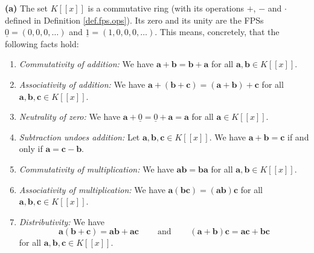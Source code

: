 \begin{theorem}
\label{thm.fps.ring}
\leantarget
\leanok
\textbf{(a)} The set $K\left[\left[x\right]\right]$
is a commutative ring (with its operations $+$, $-$ and $\cdot$ defined in
Definition \ref{def.fps.ops}). Its zero and its unity are the FPSs
$\underline{0}=\left(0,0,0,\ldots\right)$ and $\underline{1}=\left(
1,0,0,0,\ldots\right)$. This means, concretely, that the following facts hold:

\begin{enumerate}
\item \emph{Commutativity of addition:} We have $\mathbf{a}+\mathbf{b}%
=\mathbf{b}+\mathbf{a}$ for all $\mathbf{a},\mathbf{b}\in K\left[\left[
x\right]\right]$.

\item \emph{Associativity of addition:} We have $\mathbf{a}+\left(
\mathbf{b}+\mathbf{c}\right) =\left(\mathbf{a}+\mathbf{b}\right)
+\mathbf{c}$ for all $\mathbf{a},\mathbf{b},\mathbf{c}\in K\left[\left[
x\right]\right]$.

\item \emph{Neutrality of zero:} We have $\mathbf{a}+\underline{0}%
=\underline{0}+\mathbf{a}=\mathbf{a}$ for all $\mathbf{a}\in K\left[\left[
x\right]\right]$.

\item \emph{Subtraction undoes addition:} Let $\mathbf{a},\mathbf{b}%
,\mathbf{c}\in K\left[\left[x\right]\right]$. We have $\mathbf{a}%
+\mathbf{b}=\mathbf{c}$ if and only if $\mathbf{a}=\mathbf{c}-\mathbf{b}$.

\item \emph{Commutativity of multiplication:} We have $\mathbf{ab}%
=\mathbf{ba}$ for all $\mathbf{a},\mathbf{b}\in K\left[\left[x\right]
\right]$.

\item \emph{Associativity of multiplication:} We have $\mathbf{a}\left(
\mathbf{bc}\right) =\left(\mathbf{ab}\right)\mathbf{c}$ for all
$\mathbf{a},\mathbf{b},\mathbf{c}\in K\left[\left[x\right]\right]$.

\item \emph{Distributivity:} We have%
\[
\mathbf{a}\left(\mathbf{b}+\mathbf{c}\right) =\mathbf{ab}+\mathbf{ac}%
\ \ \ \ \ \ \ \ \ \ \text{and}\ \ \ \ \ \ \ \ \ \ \left(\mathbf{a}%
+\mathbf{b}\right)\mathbf{c}=\mathbf{ac}+\mathbf{bc}%
\]
for all $\mathbf{a},\mathbf{b},\mathbf{c}\in K\left[\left[x\right]
\right]$.


\end{enumerate}
\end{theorem}
